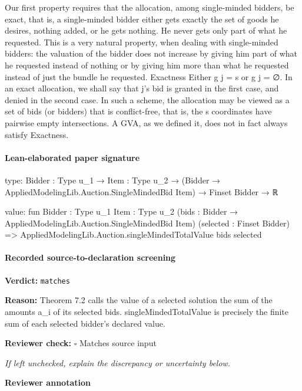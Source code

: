 \documentclass[10pt]{article}
\newcommand{\reviewerbox}{%
  \par\noindent\fbox{\parbox{0.96\linewidth}{\rule{0pt}{0.38in}}}\par
}
\newcommand{\reviewmatch}[1]{%
  \par\noindent\textbf{Reviewer check:} $\square$\; #1\par
  \noindent\emph{If left unchecked, explain the discrepancy or uncertainty below.}\par
}
\begin{document}
\begin{ReviewVerbatim}

Our first property requires that the allocation, among single-minded bidders, be
exact, that is, a single-minded bidder either gets exactly the set of goods he desires,
nothing added, or he gets nothing. He never gets only part of what he requested. This
is a very natural property, when dealing with single-minded bidders: the valuation
of the bidder does not increase by giving him part of what he requested instead of
nothing or by giving him more than what he requested instead of just the bundle
he requested.
Exactness Either g j = s or g j = ∅.
In an exact allocation, we shall say that j’s bid is granted in the first case, and denied
in the second case. In such a scheme, the allocation may be viewed as a set of bids
(or bidders) that is conflict-free, that is, the s coordinates have pairwise empty
intersections. A GVA, as we defined it, does not in fact always satisfy Exactness.
\end{ReviewVerbatim}



\paragraph{Lean-elaborated paper signature}
\begin{ReviewVerbatim}
type:
{Bidder : Type u_1} → {Item : Type u_2} → (Bidder → AppliedModelingLib.Auction.SingleMindedBid Item) → Finset Bidder → ℝ

value:
fun {Bidder : Type u_1} {Item : Type u_2} (bids : Bidder → AppliedModelingLib.Auction.SingleMindedBid Item)
    (selected : Finset Bidder) =>
  AppliedModelingLib.Auction.singleMindedTotalValue bids selected
\end{ReviewVerbatim}


\paragraph{Recorded source-to-declaration screening}
\textbf{Verdict:} \texttt{matches}
\\
{\raggedright
\textbf{Reason:} Theorem 7.\allowbreak{}2 calls the value of a selected solution the sum of the amounts a\_\allowbreak{}i of its selected bids.\allowbreak{} singleMindedTotalValue is precisely the finite sum of each selected bidder's declared value.\allowbreak{}
\par}
\reviewmatch{Matches source input}
\noindent\textbf{Reviewer annotation}\par
\reviewerbox
\clearpage
\hypertarget{paper-prerequisite-3e9f98e226155700}{}
\end{document}

